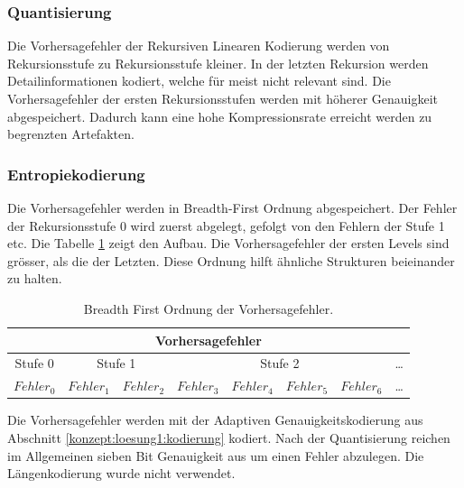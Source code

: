 \subsubsection{Quantisierung} \label{konzept:loesung2:resudial_quant}
Die Vorhersagefehler der Rekursiven Linearen Kodierung werden von Rekursionsstufe zu Rekursionsstufe kleiner. In der letzten Rekursion werden Detailinformationen kodiert, welche für meist nicht relevant sind. Die Vorhersagefehler der ersten Rekursionsstufen werden mit höherer Genauigkeit abgespeichert. Dadurch kann eine hohe Kompressionsrate erreicht werden zu begrenzten Artefakten.

\subsubsection{Entropiekodierung}
Die Vorhersagefehler werden in Breadth-First Ordnung abgespeichert. Der Fehler der Rekursionsstufe 0 wird zuerst abgelegt, gefolgt von den Fehlern der Stufe 1 etc. Die Tabelle \ref{konzept:loesung2:entropie:breath} zeigt den Aufbau. Die Vorhersagefehler der ersten Levels sind grösser, als die der Letzten. Diese Ordnung hilft ähnliche Strukturen beieinander zu halten.

\begin{table}[!htbp]
	\center
	\begin{tabular}{|c||c|c||c|c|c|c||c}
		\hline
		\multicolumn{8}{|c|}{Vorhersagefehler}\\\hline\hline
		 Stufe 0& \multicolumn{2}{|c||}{Stufe 1} & \multicolumn{4}{|c||}{Stufe 2} &\ldots \\\hline
		$Fehler_0$ & $Fehler_1$ &$Fehler_2$ &$Fehler_3$ & $Fehler_4$ & $Fehler_5$ & $Fehler_6$   & \ldots \\\hline
	\end{tabular}
	\caption{Breadth First Ordnung der Vorhersagefehler.}
	\label{konzept:loesung2:entropie:breath}
\end{table}
Die Vorhersagefehler werden mit der Adaptiven Genauigkeitskodierung aus Abschnitt \ref{konzept:loesung1:kodierung} kodiert. Nach der Quantisierung reichen im Allgemeinen sieben Bit Genauigkeit aus um einen Fehler abzulegen. Die Längenkodierung wurde nicht verwendet.
